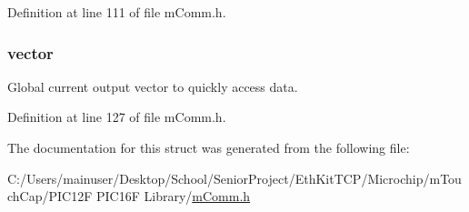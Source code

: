 Definition at line 111 of file m\+Comm.\+h.

\hypertarget{structm_comm___output_vector_ab551eac4b88e8b284085f4355e2f26b6}{}
\subsubsection[{vector}]{ vector}\label{structm_comm___output_vector_ab551eac4b88e8b284085f4355e2f26b6}


Global current output vector to quickly access data. 



Definition at line 127 of file m\+Comm.\+h.



The documentation for this struct was generated from the following file\+:\begin{DoxyCompactItemize}
\item 
C\+:/\+Users/mainuser/\+Desktop/\+School/\+Senior\+Project/\+Eth\+Kit\+T\+C\+P/\+Microchip/m\+Touch\+Cap/\+P\+I\+C12\+F P\+I\+C16\+F Library/\hyperlink{m_comm_8h}{m\+Comm.\+h}\end{DoxyCompactItemize}

